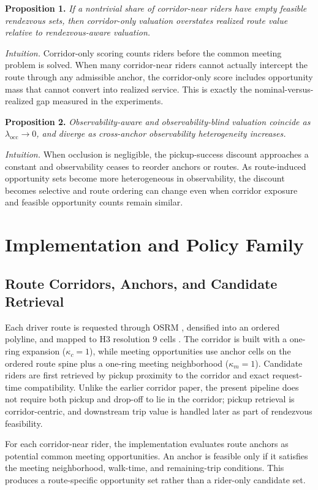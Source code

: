 \documentclass[journal]{IEEEtran}
\begin{document}
\textbf{Proposition 1.} \emph{If a nontrivial share of corridor-near riders have empty feasible rendezvous sets, then corridor-only valuation overstates realized route value relative to rendezvous-aware valuation.}

\emph{Intuition.} Corridor-only scoring counts riders before the common meeting problem is solved. When many corridor-near riders cannot actually intercept the route through any admissible anchor, the corridor-only score includes opportunity mass that cannot convert into realized service. This is exactly the nominal-versus-realized gap measured in the experiments.

\textbf{Proposition 2.} \emph{Observability-aware and observability-blind valuation coincide as $\lambda_{\mathrm{occ}}\rightarrow 0$, and diverge as cross-anchor observability heterogeneity increases.}

\emph{Intuition.} When occlusion is negligible, the pickup-success discount approaches a constant and observability ceases to reorder anchors or routes. As route-induced opportunity sets become more heterogeneous in observability, the discount becomes selective and route ordering can change even when corridor exposure and feasible opportunity counts remain similar.

\section{Implementation and Policy Family}
\subsection{Route Corridors, Anchors, and Candidate Retrieval}
Each driver route is requested through OSRM \cite{osrmapi}, densified into an ordered polyline, and mapped to H3 resolution 9 cells \cite{h3docs}. The corridor is built with a one-ring expansion ($\kappa_c=1$), while meeting opportunities use anchor cells on the ordered route spine plus a one-ring meeting neighborhood ($\kappa_m=1$). Candidate riders are first retrieved by pickup proximity to the corridor and exact request-time compatibility. Unlike the earlier corridor paper, the present pipeline does not require both pickup and drop-off to lie in the corridor; pickup retrieval is corridor-centric, and downstream trip value is handled later as part of rendezvous feasibility.

For each corridor-near rider, the implementation evaluates route anchors as potential common meeting opportunities. An anchor is feasible only if it satisfies the meeting neighborhood, walk-time, and remaining-trip conditions. This produces a route-specific opportunity set rather than a rider-only candidate set.
\end{document}
